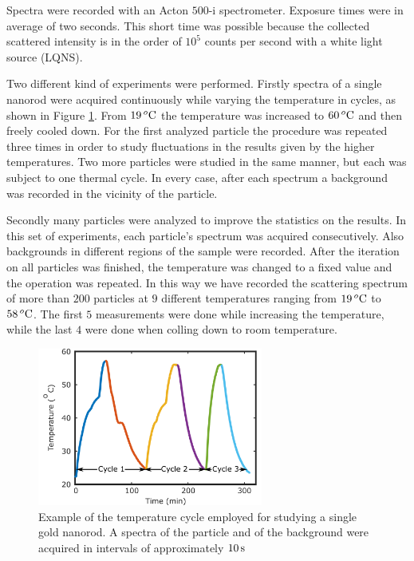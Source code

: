 Spectra were recorded with an Acton $500\textrm{-i}$ spectrometer. Exposure
times were in average of two seconds. This short time was possible because the
collected scattered intensity is in the order of $10^5$ counts per second with a
white light source (LQNS).

Two different kind of experiments were performed. Firstly spectra of a single
nanorod were acquired continuously while varying the temperature in cycles, as
shown in Figure \ref{fig:temp-cycle}. From $19\,^o\textrm{C}$ the temperature was
increased to $60\,^o\textrm{C}$ and then freely cooled down. For the first analyzed
particle the procedure was repeated three times in order to study fluctuations
in the results given by the higher temperatures. Two more particles were studied
in the same manner, but each was subject to one thermal cycle. In every case,
after each spectrum a background was recorded in the vicinity of the particle.
 
Secondly many particles were analyzed to improve the statistics on the results.
In this set of experiments, each particle's spectrum was acquired consecutively.
Also backgrounds in different regions of the sample were recorded. After the
iteration on all particles was finished, the temperature was changed to a fixed
value and the operation was repeated. In this way we have recorded the
scattering spectrum of more than $200$ particles at $9$ different temperatures
ranging from $19\,^o\textrm{C}$ to $58\,^o\textrm{C}$. The first $5$ measurements were done
while increasing the temperature, while the last $4$ were done when colling down
to room temperature.

\begin{figure}[tp] \centering
\includegraphics[width=74.2mm]{Chapters/05_WhiteLight/Figures/Supplementary/01_Temp_Cycle/01_Temp_Cycle.png}
\caption{Example of the temperature cycle employed for studying a single gold
nanorod. A spectra of the particle and of the background were acquired in
intervals of approximately $10\,\textrm{s}$}
	\label{fig:temp-cycle}
\end{figure}

